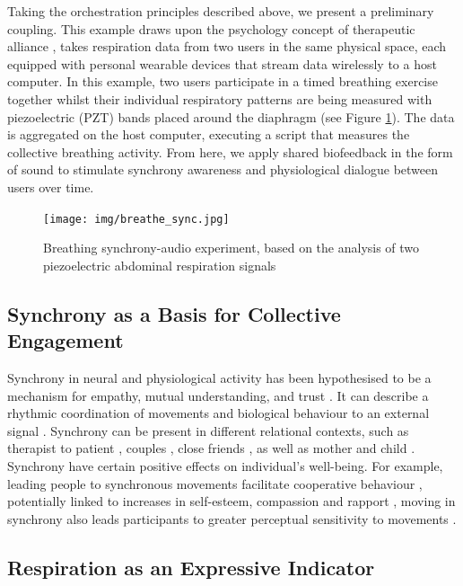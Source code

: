 Taking the orchestration principles described above, we present a preliminary coupling. This example draws upon the psychology concept of therapeutic alliance \cite{koole_synchrony_2016}, takes respiration data from two users in the same physical space, each equipped with personal wearable devices that stream data wirelessly to a host computer. In this example, two users participate in a timed breathing exercise together whilst their individual respiratory patterns are being measured with piezoelectric (PZT) bands placed around the diaphragm (see Figure \ref{fig:breathe}). The data is aggregated on the host computer, executing a script that measures the collective breathing activity. From here, we apply shared biofeedback in the form of sound to stimulate synchrony awareness and physiological dialogue between users over time.

\begin{figure}[htbp]
\centering
\texttt{[image: img/breathe\_sync.jpg]}
\caption{Breathing synchrony-audio experiment, based on the analysis of two piezoelectric abdominal respiration signals}
\label{fig:breathe}
\end{figure}

\subsection*{Synchrony as a Basis for Collective Engagement}

Synchrony in neural and physiological activity has been hypothesised to be a mechanism for empathy, mutual understanding, and trust \cite{wallot_beyond_2016}. It can describe a rhythmic coordination of movements and biological behaviour to an external signal \cite{koole_synchrony_2016}. Synchrony can be present in different relational contexts, such as therapist to patient \cite{koole_synchrony_2016}, couples \cite{karvonen_sympathetic_2016}, close friends \cite{miles_birds_2011}, as well as mother and child \cite{butler_emotional_2013}. Synchrony have certain positive effects on individual’s well-being. For example, leading people to synchronous movements facilitate cooperative behaviour \cite{kirschner_joint_2010}, potentially linked to increases in self-esteem, compassion and rapport \cite{lumsden_sync_2014, fujiwara_rhythmic_2020}, moving in synchrony also leads participants to greater perceptual sensitivity to movements \cite{zamm_endogenous_2016}.

\subsection*{Respiration as an Expressive Indicator}

